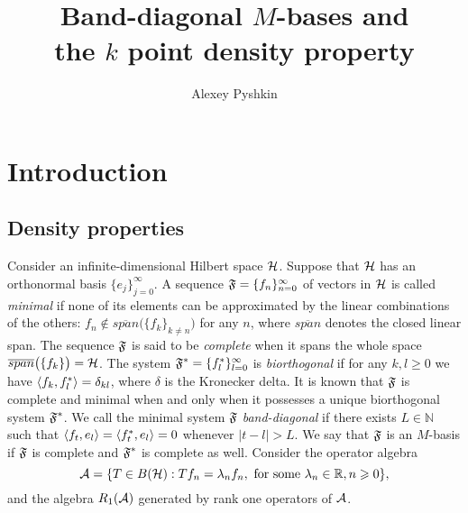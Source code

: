 \documentclass[12pt]{amsart}
\theoremstyle{case}
\begin{document}
\title{Band-diagonal $M$-bases and\\
the $k$ point density property}
\author{Alexey Pyshkin}
\maketitle

\section{Introduction}
  \subsection{Density properties}
    Consider an infinite-dimensional Hilbert space $\cal{H}$.
    Suppose that $\cal{H}$ has an orthonormal basis $\{e_j\}_{j=0}^\infty$.
    A sequence $\fsys=\seq{f}$ of vectors in $\cal{H}$ is called \emph{minimal} if none of its elements can be approximated by the linear combinations of the others: $f_n \notin
      \overline{span}\big(\{f_k\}_{k \ne n}\big)$ for any $n$, where $\overline{span}$ denotes the closed linear span.
    The sequence $\fsys$ is said to be \emph{complete} when it spans the whole space $\overline{span}\big(\{f_k\}\big)=\cal{H}$.
    The system $\fstarsys = \{f_l^*\}_{l=0}^\infty$ is \emph{biorthogonal} if for any $k,l \geq 0$ we have $\inner{f_k}{f^*_l} = \delta_{kl}$, where $\delta$ is the Kronecker delta.
    It is known that $\fsys$ is complete and minimal when and only when it possesses a unique biorthogonal system $\fstarsys$.
    We call the minimal system $\fsys$ \emph{band-diagonal} if there exists $L \in \mathbb{N}$ such that $\inner{f_t}{e_l} = \inner{f^*_t}{e_l} = 0$
      whenever $\lvert t - l \rvert > L$.
    We say that $\fsys$ is an $M$-basis if $\fsys$ is complete and $\fstarsys$ is complete as well.
    Consider the operator algebra 
    \[
      \cal{A} = \{T\in B(\cal{H}): Tf_n = \lambda_n f_n, \text{ for some } \lambda_n \in \mathbb{R}, n \geq 0\},
    \]
      and the algebra $R_1(\cal{A})$ generated by rank one operators of $\cal{A}$.
\end{document}
